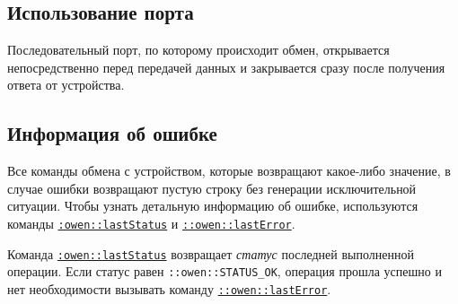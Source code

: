 \documentclass[12pt, a4paper]{article}
\newcommand{\CMD}[1]{{\tt \hyperref[#1]{#1}}}
\begin{document}
\subsection{Использование порта}

Последовательный порт, по которому происходит обмен, открывается непосредственно перед передачей данных и закрывается сразу после получения ответа от устройства.

\subsection{Информация об ошибке}

Все команды обмена с устройством, которые возвращают какое-либо значение, в случае ошибки возвращают пустую строку без генерации исключительной ситуации. Чтобы узнать детальную информацию об ошибке, используются команды \CMD{:owen::lastStatus} и \CMD{::owen::lastError}.

Команда \CMD{:owen::lastStatus} возвращает {\it статус} последней выполненной операции. Если статус равен {\tt ::owen::STATUS\_OK}, операция прошла успешно и нет необходимости вызывать команду \CMD{::owen::lastError}.
\end{document}
